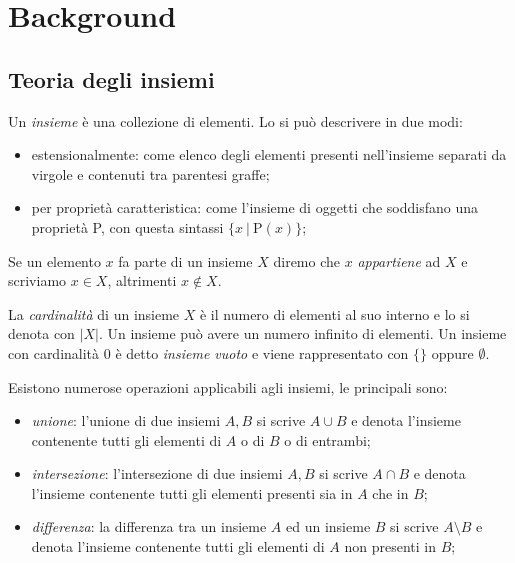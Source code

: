 \chapter{Background}\label{chapter:background}
\section{Teoria degli insiemi}
\begin{definition}[Insieme]
Un \textit{insieme} è una collezione di elementi. Lo si può descrivere in due modi: 
\begin{itemize}
    \item estensionalmente: come elenco degli elementi presenti nell'insieme separati da virgole e contenuti tra parentesi graffe;
    \item per proprietà caratteristica: come l'insieme di oggetti che soddisfano una proprietà P, con questa sintassi \(\{x\ |\ \textrm{P}(x)\}\);
\end{itemize}
\end{definition}

\begin{definition}[Appartenenza]
Se un elemento \(x\) fa parte di un insieme \(X\) diremo che \(x\) \textit{appartiene} ad \(X\) e scriviamo \(x\in X\), altrimenti \(x \notin X\).
\end{definition}

\begin{definition}[Cardinalità]
La \textit{cardinalità} di un insieme \(X\) è il numero di elementi al suo interno e lo si denota con \(|X|\). Un insieme può avere un numero infinito di elementi. Un insieme con cardinalità 0 è detto \textit{insieme vuoto} e viene rappresentato con \(\{\}\) oppure \(\emptyset\).
\end{definition}

\begin{definition}
Esistono numerose operazioni applicabili agli insiemi, le principali sono:
\begin{itemize}
    \item \textit{unione}: l'unione di due insiemi \(A, B\) si scrive \(A\cup B\) e denota l'insieme contenente tutti gli elementi di \(A\) o di \(B\) o di entrambi;
    \item \textit{intersezione}: l'intersezione di due insiemi \(A, B\) si scrive \(A\cap B\) e denota l'insieme contenente tutti gli elementi presenti sia in \(A\) che in \(B\);
    \item \textit{differenza}: la differenza tra un insieme \(A\) ed un insieme \(B\) si scrive \(A\setminus B\) e denota l'insieme contenente tutti gli elementi di \(A\) non presenti in \(B\);
\end{itemize}
\end{definition}

